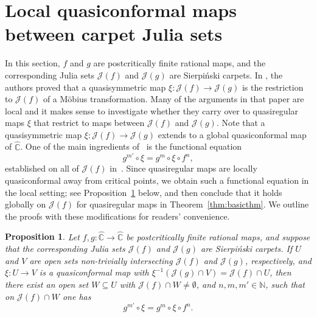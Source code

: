 \documentclass[12pt]{amsart}
\newtheorem{prop}[thm]{Proposition}
\newcommand{\C}{\mathbb{C}}
\newcommand{\N}{\mathbb{N}}
\newcommand{\ra}{\rightarrow}
\newcommand{\hC}{\widehat{\C}}
\newcommand{\J}{\mathcal{J}}
\newcommand{\co}{\colon}
\begin{document}
\section{Local quasiconformal maps between carpet Julia sets}\label{sec:review}
\noindent In this section, $f$ and $g$ are postcritically finite rational maps, and the corresponding Julia sets $\J(f)$ and $\J(g)$ are Sierpi\'nski carpets.
 In \cite[Theorem~1.4]{BLM}, the authors proved that a quasisymmetric map $\xi\co \J(f)\to\J(g)$ is the restriction to $\J(f)$ of a M\"obius transformation. 
 Many of the arguments in that paper are local and it makes sense to investigate whether they carry over to {quasiregular} maps $\xi$ that restrict to maps between $\J(f)$ and $\J(g)$. Note that a quasisymmetric map $\xi\co\J(f)\to\J(g)$ extends to a global quasiconformal map of $\hC$. One of the main ingredients of~\cite{BLM} is the functional equation~\cite[Equation~(1.2)]{BLM} 
 $$
  g^{m'}\circ \xi = g^m\circ \xi \circ f^n,
 $$
established on all of $\J(f)$ in~\cite[Section~8, Step IV]{BLM}.
Since quasiregular maps are locally quasiconformal away from critical points, 
we obtain such a functional equation in the local setting; see Proposition~\ref{prop:basic} below, and then conclude that it holds globally on $\J(f)$ for quasiregular maps in Theorem~\ref{thm:basicthm}. 
We outline the proofs with these modifications for readers' convenience. 
\begin{prop}\label{prop:basic}
Let $f, g\co \hC \to \hC$ be postcritically finite rational maps, and suppose that the corresponding Julia sets $\J(f)$ and $\J(g)$ are Sierpi\'nski carpets. 
If $U$ and $V$ are open sets non-trivially intersecting $\J(f)$ and $\J(g)$, respectively, and $\xi\co U \ra V$ is a quasiconformal map with $\xi^{-1}(\J(g)\cap V)=\J(f)\cap U$, then there exist an open set $W\subseteq U$ with $\J(f)\cap W\neq\emptyset$, and $n, m, m'\in \N$,
such that on $\J(f)\cap W$ one has
\begin{equation}\label{eq:keyeq}
  g^{m'}\circ \xi = g^m\circ \xi \circ f^n.
\end{equation}
\end{prop}
\end{document}
